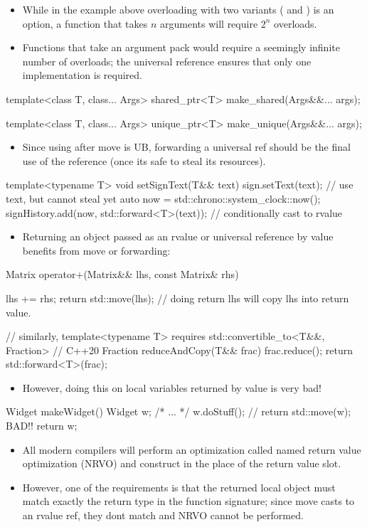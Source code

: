\begin{itemize}
  \item While in the example above overloading  with two variants ( and ) is an option, a function that takes $n$ arguments will require $2^n$ overloads.
  \item Functions that take an argument pack would require a seemingly infinite number of overloads; the universal reference ensures that only one implementation is required.
\end{itemize}
\begin{cppcode}
template<class T, class... Args>
shared_ptr<T> make_shared(Args&&... args);

template<class T, class... Args> 
unique_ptr<T> make_unique(Args&&... args);
\end{cppcode}
\begin{itemize}
  \item Since using after move is UB, forwarding a universal ref should be the final use of the reference (once its safe to steal its resources).
\end{itemize}
\begin{cppcode}
template<typename T>
void setSignText(T&& text) {
  sign.setText(text); // use text, but cannot steal yet
  auto now = std::chrono::system_clock::now();
  signHistory.add(now, std::forward<T>(text)); // conditionally cast to rvalue
}
\end{cppcode}
\begin{itemize}
  \item Returning an object passed as an rvalue or universal reference by value benefits from move or forwarding:
\end{itemize}
\begin{cppcode}
Matrix operator+(Matrix&& lhs, const Matrix& rhs) {
  lhs += rhs;
  return std::move(lhs); // doing return lhs will copy lhs into return value.
  
}
// similarly,
template<typename T>
requires std::convertible_to<T&&, Fraction> // C++20
Fraction reduceAndCopy(T&& frac) {
  frac.reduce();
  return std::forward<T>(frac);
}
\end{cppcode}
\begin{itemize}
  \item However, doing this on local variables returned by value is very bad!
\end{itemize}
\begin{cppcode}
Widget makeWidget() {
  Widget w;
  /* ... */
  w.doStuff();
  // return std::move(w); BAD!!
  return w;
}
\end{cppcode}
\begin{itemize}
  \item All modern compilers will perform an optimization called named return value optimization (NRVO) and construct  in the place of the return value slot.
  \item However, one of the requirements is that the returned local object must match exactly the return type in the function signature; since move casts to an rvalue ref, they dont match and NRVO cannot be performed.
\end{itemize}

